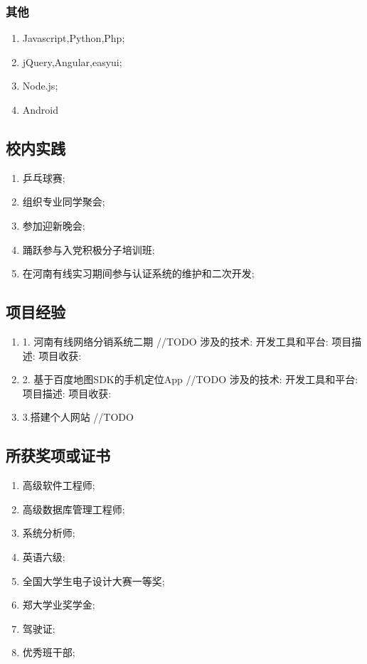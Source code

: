 \documentclass[UTF8]{ctexart}
\begin{document}
\subsubsection{其他}
\label{sec-1-2-4}
\begin{enumerate}
\item Javascript,Python,Php;
\item jQuery,Angular,easyui;
\item Node.js;
\item Android
\end{enumerate}
\subsection{校内实践}
\label{sec-1-3}
\begin{enumerate}
\item 乒乓球赛;
\item 组织专业同学聚会;
\item 参加迎新晚会;
\item 踊跃参与入党积极分子培训班;
\item 在河南有线实习期间参与认证系统的维护和二次开发;
\end{enumerate}
\subsection{项目经验}
\label{sec-1-4}
\begin{enumerate}
\item 1. 河南有线网络分销系统二期
\label{sec-1-4-0-1}
//TODO
涉及的技术:
开发工具和平台:
项目描述:
项目收获:
\item 2. 基于百度地图SDK的手机定位App
\label{sec-1-4-0-2}
//TODO
涉及的技术:
开发工具和平台:
项目描述:
项目收获:
\item 3.搭建个人网站
\label{sec-1-4-0-3}
//TODO
\end{enumerate}
\subsection{所获奖项或证书}
\label{sec-1-5}
\begin{enumerate}
\item 高级软件工程师;\\
\item 高级数据库管理工程师;\\
\item 系统分析师;\\
\item 英语六级;\\
\item 全国大学生电子设计大赛一等奖;\\
\item 郑大学业奖学金;\\
\item 驾驶证;\\
\item 优秀班干部;\\
\end{enumerate}
\end{document}

